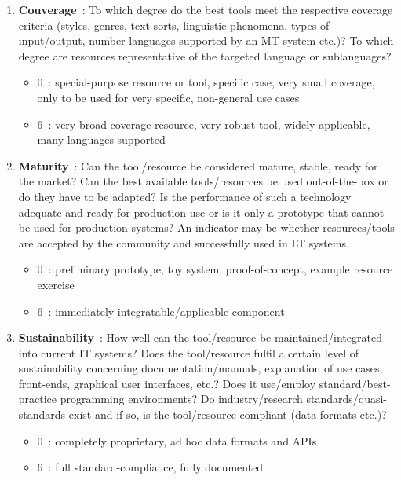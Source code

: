 \begin{multicols}{2}
\begin{enumerate}
\item {\bf Couverage}~: To which degree do the best tools meet the respective coverage criteria (styles, genres, text sorts, linguistic phenomena, types of input/output, number languages supported by an MT system etc.)? To which degree are resources representative of the targeted language or sublanguages?
      \begin{itemize}
      \item 0~: special-purpose resource or tool, specific case, very small coverage, only to be used for very specific, non-general use cases
      \item 6~: very broad coverage resource, very robust tool, widely applicable, many languages supported
      \end{itemize}

\item {\bf Maturity}~: Can the tool/resource be considered mature, stable, ready for the market? Can the best available tools/resources be used out-of-the-box or do they have to be adapted? Is the performance of such a technology adequate and ready for production use or is it only a prototype that cannot be used for production systems? An indicator may be whether resources/tools are accepted by the community and successfully used in LT systems.  
     \begin{itemize}
      \item 0~: preliminary prototype, toy system, proof-of-concept, example resource exercise
      \item 6~: immediately integratable/applicable component
      \end{itemize}

\item {\bf Sustainability}~: How well can the tool/resource be maintained/integrated into current IT systems? Does the tool/resource fulfil a certain level of sustainability concerning documentation/manuals, explanation of use cases, front-ends, graphical user interfaces, etc.? Does it use/employ standard/best-practice programming environments? Do industry/research standards/quasi-standards exist and if so, is the tool/resource compliant (data formats etc.)?
      \begin{itemize}
      \item 0~: completely proprietary, ad hoc data formats and APIs
      \item 6~: full standard-compliance, fully documented
      \end{itemize}


\end{enumerate}
\end{multicols}
